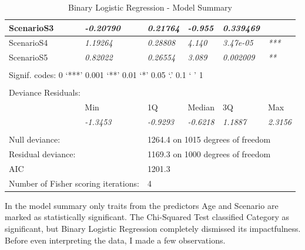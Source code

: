 \documentclass[a4paper]{article}
\begin{document}
\begin{table}[ht]
\begin{center}
\begin{tabular}{ | l | l | l | l | l | l | }
    ScenarioS3 & \textit{-0.20790} & \textit{0.21764} & \textit{-0.955} & \textit{0.339469} & \textit{} \\ \hline
    ScenarioS4 & \textit{1.19264} & \textit{0.28808} & \textit{4.140} & \textit{3.47e-05} & \textit{***} \\ \hline
    ScenarioS5 & \textit{0.82022} & \textit{0.26554} & \textit{3.089} & \textit{0.002009} & \textit{**} \\ \hline
    
    \multicolumn{6}{l}{} \\ \hline
    
    \multicolumn{6}{|l|}{Signif. codes:  0 ‘***’ 0.001 ‘**’ 0.01 ‘*’ 0.05 ‘.’ 0.1 ‘ ’ 1} \\ \hline
    
    \multicolumn{6}{l}{} \\ \hline
    
    \multicolumn{6}{|l|}{Deviance Residuals:} \\ \hline
    & Min & 1Q & Median & 3Q & Max \\ \hline
    & \textit{-1.3453} & \textit{-0.9293} & \textit{-0.6218} & \textit{1.1887} & \textit{2.3156} \\ \hline
    
    \multicolumn{6}{l}{} \\ \hline
    
    \multicolumn{2}{|l|}{Null deviance:} & \multicolumn{4}{|l|}{1264.4 on 1015 degrees of freedom} \\ \hline
    \multicolumn{2}{|l|}{Residual deviance:} & \multicolumn{4}{|l|}{1169.3 on 1000 degrees of freedom} \\ \hline
    \multicolumn{2}{|l|}{AIC} & \multicolumn{4}{|l|}{1201.3} \\ \hline
    \multicolumn{2}{|l|}{Number of Fisher scoring iterations:} & \multicolumn{4}{|l|}{4} \\ \hline
    
    \end{tabular}
\end{center}
\caption{Binary Logistic Regression - Model Summary}
\label{tb-binary-summary}
\end{table}
\endgroup

\medskip

\noindent
In the model summary only traits from the predictors Age and Scenario are marked as statistically significant. The Chi-Squared Test classified Category as significant, but Binary Logistic Regression completely dismissed its impactfulness. Before even interpreting the data, I made a few observations.
\end{document}
